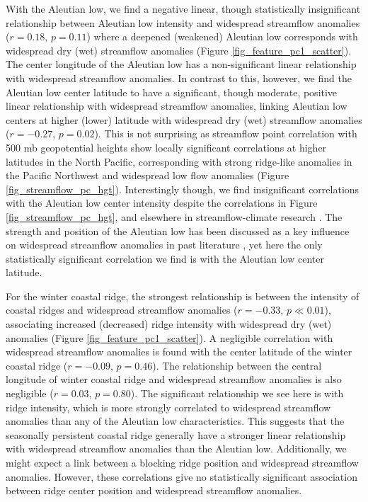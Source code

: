 \documentclass[final, double]{ua-thesis}
\begin{document}
With the Aleutian low, we find a negative linear, though statistically insignificant relationship between Aleutian low intensity and widespread streamflow anomalies ($r = 0.18$, $p = 0.11$) where a deepened (weakened) Aleutian low corresponds with widespread dry (wet) streamflow anomalies (Figure \ref{fig_feature_pc1_scatter}). The center longitude of the Aleutian low has a non-significant linear relationship with widespread streamflow anomalies. In contrast to this, however, we find the Aleutian low center latitude to have a significant, though moderate, positive linear relationship with widespread streamflow anomalies, linking Aleutian low centers at higher (lower) latitude with widespread dry (wet) streamflow anomalies ($r = -0.27$, $p = 0.02$). This is not surprising as streamflow point correlation with 500 mb geopotential heights show locally significant correlations at higher latitudes in the North Pacific, corresponding with strong ridge-like anomalies in the Pacific Northwest and widespread low flow anomalies (Figure \ref{fig_streamflow_pc_hgt}). Interestingly though, we find insignificant correlations with the Aleutian low center intensity despite the correlations in Figure \ref{fig_streamflow_pc_hgt}, and elsewhere in streamflow-climate research \citep[e.g., ][]{2cayan_influence_1989, 2lins_regional_1997, 2malevich_pacific_2016}. The strength and position of the Aleutian low has been discussed as a key influence on widespread streamflow anomalies in past literature \citep[e.g., ][]{2cayan_influence_1989, 2lins_regional_1997}, yet here the only statistically significant correlation we find is with the Aleutian low center latitude.

For the winter coastal ridge, the strongest relationship is between the intensity of coastal ridges and widespread streamflow anomalies ($r = -0.33$, $p \ll 0.01$), associating increased (decreased) ridge intensity with widespread dry (wet) anomalies (Figure \ref{fig_feature_pc1_scatter}). A negligible correlation with widespread streamflow anomalies is found with the center latitude of the winter coastal ridge ($r = -0.09$, $p = 0.46$). The relationship between the central longitude of winter coastal ridge and widespread streamflow anomalies is also negligible ($r = 0.03$, $p = 0.80$). The significant relationship we see here is with ridge intensity, which is more strongly correlated to widespread streamflow anomalies than any of the Aleutian low characteristics. This suggests that the seasonally persistent coastal ridge generally have a stronger linear relationship with widespread streamflow anomalies than the Aleutian low. Additionally, we might expect a link between a blocking ridge position and widespread streamflow anomalies. However, these correlations give no statistically significant association between ridge center position and widespread streamflow anomalies.
\end{document}
